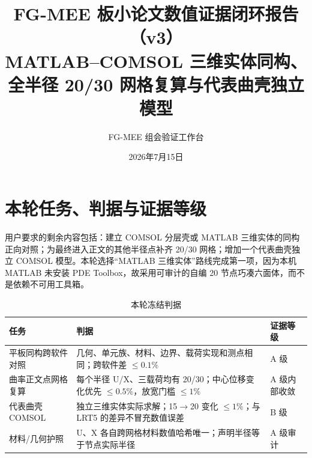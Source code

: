 \documentclass[UTF8,fontset=windows,11pt,a4paper]{ctexart}
\title{\textbf{FG-MEE 板小论文数值证据闭环报告（v3）}\\[0.35em]
\large MATLAB--COMSOL 三维实体同构、全半径 20/30 网格复算与代表曲壳独立模型}
\author{FG-MEE 组会验证工作台}
\date{2026年7月15日}
\begin{document}
\maketitle

\begin{center}
\end{center}

\newpage
\tableofcontents
\newpage

\section{本轮任务、判据与证据等级}

用户要求的剩余内容包括：建立 COMSOL 分层壳或 MATLAB 三维实体的同构正向对照；为最终进入正文的其他半径点补齐 20/30 网格；增加一个代表曲壳独立 COMSOL 模型。本轮选择“MATLAB 三维实体”路线完成第一项，因为本机 MATLAB 未安装 PDE Toolbox，故采用可审计的自编 20 节点巧凑六面体，而不是依赖不可用工具箱。

\begin{table}[H]
\centering
\caption{本轮冻结判据}
\begin{tabularx}{\textwidth}{p{}Xp{}}
\toprule
任务 & 判据 & 证据等级 \\
\midrule
平板同构跨软件对照 & 几何、单元族、材料、边界、载荷实现和测点相同；跨软件差 $\leq0.1\%$ & A 级 \\
曲率正文点网格复算 & 每个半径 U/X、三载荷均有 20/30；中心位移变化优先 $\leq0.5\%$，放宽门槛 $\leq1\%$ & A 级内部收敛 \\
代表曲壳 COMSOL & 独立三维实体实际求解；15$\to$20 变化 $\leq1\%$；与 LRT5 的差异不冒充数值误差 & B 级 \\
材料/几何护照 & U、X 各自跨网格材料数值哈希唯一；声明半径等于节点实际半径 & A 级审计 \\
\bottomrule
\end{tabularx}
\end{table}
\end{document}
